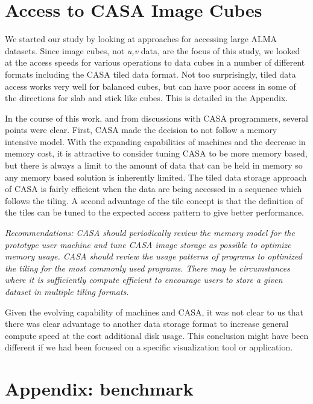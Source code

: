 \documentclass{article}
\begin{document}
\newpage
\section{Access to CASA Image Cubes}

We started our study by looking at approaches for accessing large
ALMA datasets. Since image cubes, not {\it u,v} data, are the
focus of this study, we looked at the access speeds for various
operations to data cubes in a number of different formats including
the CASA tiled data format. Not too surprisingly, tiled data 
access works very well for balanced cubes, but can have poor 
access in some of the directions for slab and stick like cubes.
This is detailed in the Appendix.

In the course of this work, and from discussions with CASA programmers,
several points were clear. First, CASA made the decision to not follow
a memory intensive model. With the expanding capabilities of machines and
the decrease in memory cost, it is attractive to consider tuning CASA
to be more memory based, but there is always a limit to the amount of
data that can be held in memory so any memory based solution is 
inherently limited. The tiled data storage approach of CASA is
fairly efficient when the data are being accessed in a sequence which
follows the tiling. A second advantage of the tile concept is that
the definition of the tiles can be tuned to the expected access pattern
to give better performance.

{\it Recommendations: CASA should periodically review the memory model
for the prototype user machine and tune CASA image storage as possible to optimize
memory usage. CASA should review the usage patterns of programs to
optimized the tiling for the most commonly used programs. There may be
circumstances where it is sufficiently compute efficient to encourage users
to store a given dataset in multiple tiling formats.}

Given the evolving capability of machines and CASA, it was not clear to us
that there was clear advantage to another data storage format to increase
general compute speed at the cost additional disk usage. This conclusion
might have been different if we had been focused on a specific visualization
tool or application.

\section*{Appendix: benchmark}
\end{document}
